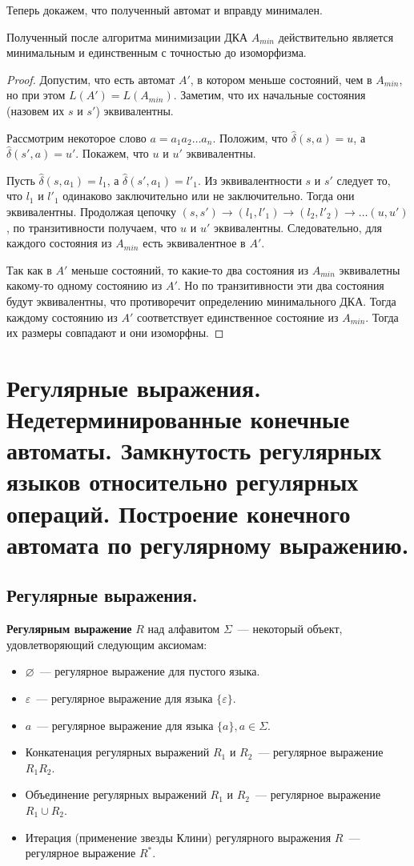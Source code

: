 \documentclass[a4paper,12pt]{article}
\begin{document}
	Теперь докажем, что полученный автомат и вправду минимален.
	
	\begin{theorem}
		Полученный после алгоритма минимизации ДКА $A_{min}$ действительно является минимальным и единственным с точностью до изоморфизма.
	\end{theorem}
	\begin{proof}
		Допустим, что есть автомат $A'$, в котором меньше состояний, чем в $A_{min}$, но при этом $L(A') = L(A_{min})$. Заметим, что их начальные состояния (назовем их $s$ и $s'$) эквивалентны.
		
		Рассмотрим некоторое слово $a = a_1 a_2 \ldots a_n$. Положим, что $\hat{\delta}(s, a) = u$, а  $\hat{\delta}(s', a) = u'$. Покажем, что $u$ и $u'$ эквивалентны.
		
		Пусть  $\hat{\delta}(s, a_1) = l_1$, а  $\hat{\delta}(s', a_1) = l'_1$. Из эквивалентности $s$ и $s'$ следует то, что $l_1$ и  $l'_1$ одинаково заключительно или не заключительно. Тогда они эквивалентны. Продолжая цепочку $(s, s') \to (l_1, l'_1) \to (l_2, l'_2) \to \ldots (u, u')$, по транзитивности получаем, что $u$ и $u'$ эквивалентны. Следовательно, для каждого состояния из $A_{min}$ есть эквивалентное в $A'$.
		
		Так как в $A'$ меньше состояний, то какие-то два состояния из $A_{min}$ эквивалетны какому-то одному состоянию из $A'$. Но по транзитивности эти два состояния будут эквивалентны, что противоречит определению минимального ДКА. Тогда каждому состоянию из $A'$ соответствует единственное состояние из $A_{min}$. Тогда их размеры совпадают и они изоморфны.
	\end{proof}
\newpage
\section{Регулярные выражения. Недетерминированные конечные автоматы. Замкнутость регулярных языков относительно регулярных операций. Построение конечного автомата по регулярному выражению.}
	\subsection{Регулярные выражения.}
	\textbf{Регулярным выражение} $R$ над алфавитом $\Sigma$~--- некоторый объект, удовлетворяющий следующим аксиомам:
	\begin{itemize}
		\item $\varnothing$~--- регулярное выражение для пустого языка.
		\item $\varepsilon$~--- регулярное выражение для языка $\{\varepsilon\}$.
		\item $a$~--- регулярное выражение для языка $\{a\}, a \in \Sigma$.
		\item Конкатенация регулярных выражений $R_1$ и $R_2$~--- регулярное выражение $R_1R_2$.
		\item Объединение регулярных выражений $R_1$ и $R_2$~--- регулярное выражение $R_1 \cup R_2$.
		\item Итерация (применение звезды Клини) регулярного выражения $R$~--- регулярное выражение $R^*$.
	\end{itemize} 
\end{document}
